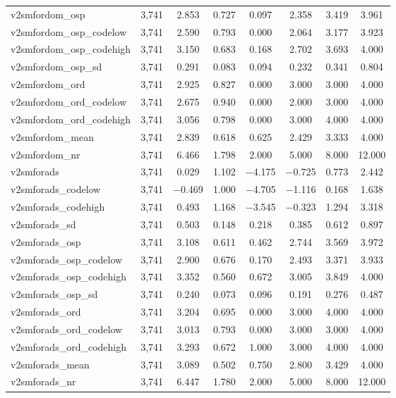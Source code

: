 \begin{table}[!htbp]
\begin{tabular}{@{\extracolsep{5pt}}lccccccc}
v2smfordom\_osp & 3,741 & 2.853 & 0.727 & 0.097 & 2.358 & 3.419 & 3.961 \\ 
v2smfordom\_osp\_codelow & 3,741 & 2.590 & 0.793 & 0.000 & 2.064 & 3.177 & 3.923 \\ 
v2smfordom\_osp\_codehigh & 3,741 & 3.150 & 0.683 & 0.168 & 2.702 & 3.693 & 4.000 \\ 
v2smfordom\_osp\_sd & 3,741 & 0.291 & 0.083 & 0.094 & 0.232 & 0.341 & 0.804 \\ 
v2smfordom\_ord & 3,741 & 2.925 & 0.827 & 0.000 & 3.000 & 3.000 & 4.000 \\ 
v2smfordom\_ord\_codelow & 3,741 & 2.675 & 0.940 & 0.000 & 2.000 & 3.000 & 4.000 \\ 
v2smfordom\_ord\_codehigh & 3,741 & 3.056 & 0.798 & 0.000 & 3.000 & 4.000 & 4.000 \\ 
v2smfordom\_mean & 3,741 & 2.839 & 0.618 & 0.625 & 2.429 & 3.333 & 4.000 \\ 
v2smfordom\_nr & 3,741 & 6.466 & 1.798 & 2.000 & 5.000 & 8.000 & 12.000 \\ 
v2smforads & 3,741 & 0.029 & 1.102 & $-$4.175 & $-$0.725 & 0.773 & 2.442 \\ 
v2smforads\_codelow & 3,741 & $-$0.469 & 1.000 & $-$4.705 & $-$1.116 & 0.168 & 1.638 \\ 
v2smforads\_codehigh & 3,741 & 0.493 & 1.168 & $-$3.545 & $-$0.323 & 1.294 & 3.318 \\ 
v2smforads\_sd & 3,741 & 0.503 & 0.148 & 0.218 & 0.385 & 0.612 & 0.897 \\ 
v2smforads\_osp & 3,741 & 3.108 & 0.611 & 0.462 & 2.744 & 3.569 & 3.972 \\ 
v2smforads\_osp\_codelow & 3,741 & 2.900 & 0.676 & 0.170 & 2.493 & 3.371 & 3.933 \\ 
v2smforads\_osp\_codehigh & 3,741 & 3.352 & 0.560 & 0.672 & 3.005 & 3.849 & 4.000 \\ 
v2smforads\_osp\_sd & 3,741 & 0.240 & 0.073 & 0.096 & 0.191 & 0.276 & 0.487 \\ 
v2smforads\_ord & 3,741 & 3.204 & 0.695 & 0.000 & 3.000 & 4.000 & 4.000 \\ 
v2smforads\_ord\_codelow & 3,741 & 3.013 & 0.793 & 0.000 & 3.000 & 3.000 & 4.000 \\ 
v2smforads\_ord\_codehigh & 3,741 & 3.293 & 0.672 & 1.000 & 3.000 & 4.000 & 4.000 \\ 
v2smforads\_mean & 3,741 & 3.089 & 0.502 & 0.750 & 2.800 & 3.429 & 4.000 \\ 
v2smforads\_nr & 3,741 & 6.447 & 1.780 & 2.000 & 5.000 & 8.000 & 12.000 \\ 

\end{tabular}
\end{table}
